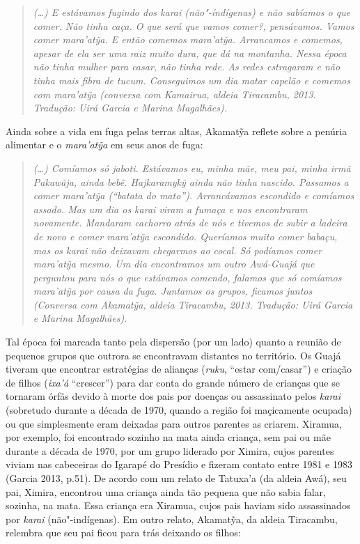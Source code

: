 \begin{quote}
\emph{(\ldots{}) E estávamos fugindo dos karai (não"-índígenas) e não
sabíamos o que comer. Não tinha caça. O que será que vamos comer?,
pensávamos. Vamos comer mara'atỹa. E então comemos mara'atỹa. Arrancamos
e comemos, apesar de ela ser uma raiz muito dura, que dá na montanha.
Nessa época não tinha mulher para casar, não tinha rede. As redes
estragaram e não tinha mais fibra de tucum. Conseguimos um dia matar
capelão e comemos com mara'atỹa (conversa com Kamairua, aldeia
Tiracambu, 2013. Tradução: Uirá Garcia e Marina Magalhães).}
\end{quote}

Ainda sobre a vida em fuga pelas terras altas, Akamatỹa reflete sobre a
penúria alimentar e o \emph{mara'atỹa} em seus anos de fuga:

\begin{quote}
\emph{(\ldots{}) Comíamos só jaboti. Estávamos eu, minha mãe, meu pai,
minha irmã Pakawãja, ainda bebê. Hajkaramykỹ ainda não tinha nascido.
Passamos a comer mara'atỹa (``batata do mato''). Arrancávamos escondido
e comíamos assado. Mas um dia os karai viram a fumaça e nos encontraram
novamente. Mandaram cachorro atrás de nós e tivemos de subir a ladeira
de novo e comer mara'atỹa escondido. Queríamos muito comer babaçu, mas
os karai não deixavam chegarmos ao cocal. Só podíamos comer mara'atỹa
mesmo. Um dia encontramos um outro Awá-Guajá que perguntou para nós o
que estávamos comendo, falamos que só comíamos mara'atỹa por causa da
fuga. Juntamos os grupos, ficamos juntos (Conversa com Akamatỹa,
aldeia Tiracambu, 2013. Tradução: Uirá Garcia e Marina Magalhães).}
\end{quote}

Tal época foi marcada tanto pela dispersão (por um lado) quanto a
reunião de pequenos grupos que outrora se encontravam distantes no
território. Os Guajá tiveram que encontrar estratégias de alianças
(\emph{ruku}, ``estar com/casar'') e criação de filhos (\emph{ixa'á}
``crescer'') para dar conta do grande número de crianças que se tornaram
órfãs devido à morte dos pais por doenças ou assassinato pelos
\emph{karai} (sobretudo durante a década de 1970, quando a região foi
maçicamente ocupada) ou que simplesmente eram deixadas para outros
parentes as criarem. Xiramua, por exemplo, foi encontrado sozinho na
mata ainda criança, sem pai ou mãe durante a década de 1970, por um
grupo liderado por Ximira, cujos parentes viviam nas cabeceiras do
Igarapé do Presídio e fizeram contato entre 1981 e 1983 (Garcia 2013,
p.51). De acordo com um relato de Tatuxa'a (da aldeia Awá), seu pai,
Ximira, encontrou uma criança ainda tão pequena que não sabia falar,
sozinha, na mata. Essa criança era Xiramua, cujos pais haviam sido
assassinados por \emph{karai} (não"-indígenas). Em outro relato,
Akamatỹa, da aldeia Tiracambu, relembra que seu pai ficou para trás
deixando os filhos:

